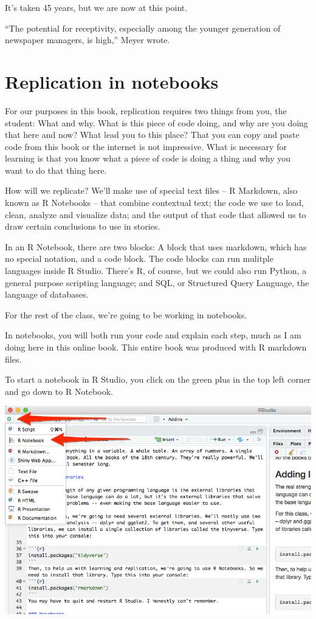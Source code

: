 \documentclass[
  letterpaper,
  DIV=11,
  numbers=noendperiod]{scrreprt}
\begin{document}
It's taken 45 years, but we are now at this point.

``The potential for receptivity, especially among the younger generation
of newspaper managers, is high,'' Meyer wrote.

\hypertarget{replication-in-notebooks}{%
\section{Replication in notebooks}\label{replication-in-notebooks}}

For our purposes in this book, replication requires two things from you,
the student: What and why. What is this piece of code doing, and why are
you doing that here and now? What lead you to this place? That you can
copy and paste code from this book or the internet is not impressive.
What is necessary for learning is that you know what a piece of code is
doing a thing and why you want to do that thing here.

How will we replicate? We'll make use of special text files -- R
Markdown, also known as R Notebooks -- that combine contextual text; the
code we use to load, clean, analyze and visualize data; and the output
of that code that allowed us to draw certain conclusions to use in
stories.

In an R Notebook, there are two blocks: A block that uses markdown,
which has no special notation, and a code block. The code blocks can run
mulitple languages inside R Studio. There's R, of course, but we could
also run Python, a general purpose scripting language; and SQL, or
Structured Query Language, the language of databases.

For the rest of the class, we're going to be working in notebooks.

In notebooks, you will both run your code and explain each step, much as
I am doing here in this online book. This entire book was produced with
R markdown files.

To start a notebook in R Studio, you click on the green plus in the top
left corner and go down to R Notebook.

\includegraphics{./images/verybasics2.png}
\end{document}
